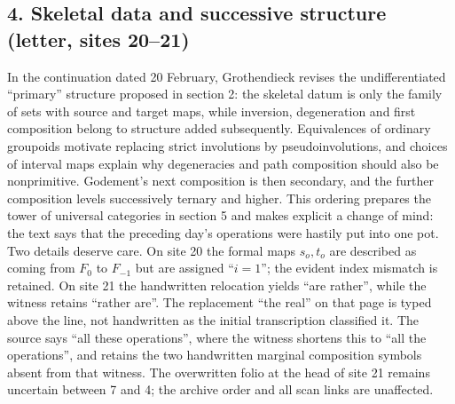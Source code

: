 \subsection*{4. Skeletal data and successive structure (letter, sites 20--21)}
In the continuation dated 20 February, Grothendieck revises the undifferentiated ``primary'' structure proposed in section 2: the skeletal datum is only the family of sets with source and target maps, while inversion, degeneration and first composition belong to structure added subsequently. Equivalences of ordinary groupoids motivate replacing strict involutions by pseudoinvolutions, and choices of interval maps explain why degeneracies and path composition should also be nonprimitive. Godement's next composition is then secondary, and the further composition levels successively ternary and higher. This ordering prepares the tower of universal categories in section 5 and makes explicit a change of mind: the text says that the preceding day's operations were hastily put into one pot. Two details deserve care. On site 20 the formal maps $s_o,t_o$ are described as coming from $F_0$ to $F_{-1}$ but are assigned ``$i=1$''; the evident index mismatch is retained. On site 21 the handwritten relocation yields ``are rather'', while the witness retains ``rather are''. The replacement ``the real'' on that page is typed above the line, not handwritten as the initial transcription classified it. The source says ``all these operations'', where the witness shortens this to ``all the operations'', and retains the two handwritten marginal composition symbols absent from that witness. The overwritten folio at the head of site 21 remains uncertain between 7 and 4; the archive order and all scan links are unaffected.

